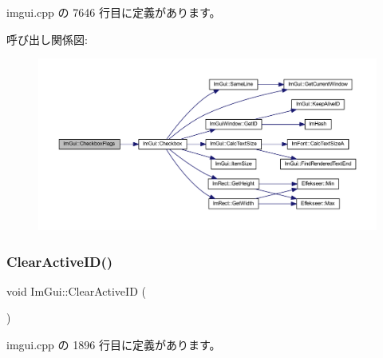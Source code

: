  imgui.\+cpp の 7646 行目に定義があります。

呼び出し関係図\+:\nopagebreak
\begin{figure}[H]
\begin{center}
\leavevmode
\includegraphics[width=350pt]{namespace_im_gui_aeca400dcf5a82c312b3e669d2fe6e88d_cgraph}
\end{center}
\end{figure}
\mbox{\label{namespace_im_gui_a17ff60ad1e2669130ac38a04d16eb354}} 
\subsubsection{\texorpdfstring{Clear\+Active\+I\+D()}{ClearActiveID()}}
{\footnotesize\ttfamily void Im\+Gui\+::\+Clear\+Active\+ID (\begin{DoxyParamCaption}{ }\end{DoxyParamCaption})}



 imgui.\+cpp の 1896 行目に定義があります。

